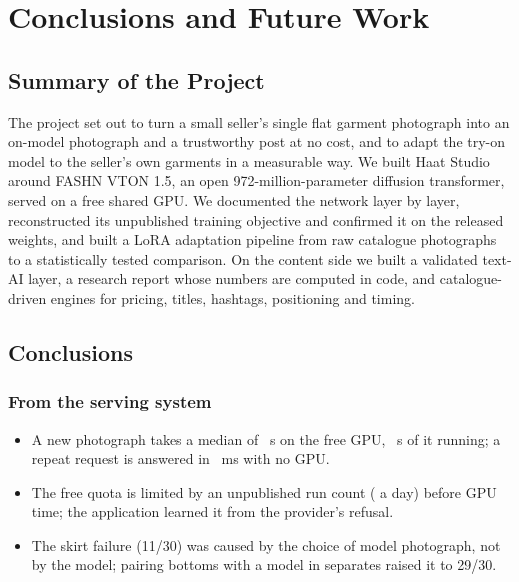\chapter{Conclusions and Future Work}

\section{Summary of the Project}

The project set out to turn a small seller's single flat garment photograph into an on-model photograph and a trustworthy post at no cost, and to adapt the try-on model to the seller's own garments in a measurable way. We built Haat Studio around FASHN VTON 1.5, an open 972-million-parameter diffusion transformer, served on a free shared GPU. We documented the network layer by layer, reconstructed its unpublished training objective and confirmed it on the released weights, and built a LoRA adaptation pipeline from raw catalogue photographs to a statistically tested comparison. On the content side we built a validated text-AI layer, a research report whose numbers are computed in code, and catalogue-driven engines for pricing, titles, hashtags, positioning and timing.

\section{Conclusions}

\subsection{From the serving system}
\begin{itemize}
\item A new photograph takes a median of \vMedTotal{}~s on the free GPU, \vMedGpu{}~s of it running; a repeat request is answered in \vCacheMs{}~ms with no GPU.
\item The free quota is limited by an unpublished run count (\vRunsLimit{} a day) before GPU time; the application learned it from the provider's refusal.
\item The skirt failure (11/30) was caused by the choice of model photograph, not by the model; pairing bottoms with a model in separates raised it to 29/30.
\end{itemize}

